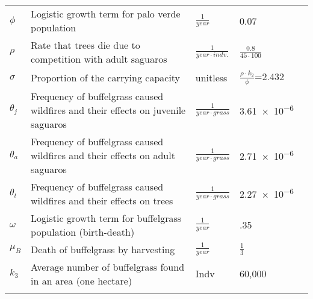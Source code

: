 \begin{longtable}{m{1cm} m{6cm} m{1.5cm} m{1cm} m{1.3cm}}
\rule{0pt}{.7cm}$\phi$ & Logistic growth term for palo verde population &  $\displaystyle\frac{1}{year}$ & 0.07 & \cite{paloVerdeFacts}\\

\rule{0pt}{.7cm}$\rho$ & Rate that trees die due to competition with adult saguaros & $\displaystyle\frac{1}{year\cdot indv.}$&$\frac{0.8}{45 \cdot 100}$ & \cite{Orum,PaloVFact,Bashan2009}\\

\rule{0pt}{.7cm}$\sigma$ & Proportion of the carrying capacity & unitless & $\displaystyle\frac{\rho \cdot k_2}{\phi}$=2.432 & \cite{Orum,PaloVFact,Bashan2009,A-SdesertMuseum,paloVerdeFacts}\\

\rule{0pt}{.7cm}$\theta_j$ & Frequency of buffelgrass caused wildfires and their effects on juvenile saguaros & $\displaystyle\frac{1}{year \cdot grass}$ & \num{3.61e-6} & \cite{kaufman2007invasive,FirePdistance,BuffelManag,Wildfire}\\

\rule{0pt}{.7cm}$\theta_a$ & Frequency of buffelgrass caused wildfires and their effects on adult saguaros & $\displaystyle\frac{1}{year \cdot grass}$ & \num{2.71e-6} & \cite{buyuktahtakin2014invasive,kaufman2007invasive,FirePdistance,BuffelManag,Wildfire}\\

\rule{0pt}{.7cm}$\theta_t$ & Frequency of buffelgrass caused wildfires and their effects on trees & $\displaystyle\frac{1}{year \cdot grass}$ & \num{2.27e-6} & \cite{FireEffects,kaufman2007invasive,FirePdistance,BuffelManag,Wildfire} \\

\rule{0pt}{.7cm}$\omega$ & Logistic growth term for buffelgrass population (birth-death) & $\displaystyle\frac{1}{year}$ & .35 & \cite{NPSbuffelFact}\\

\rule{0pt}{.7cm}$\mu_B$ & Death of buffelgrass by harvesting & $\displaystyle\frac{1}{year}$ & $\displaystyle\frac{1}{3}$ & \cite{NPSbuffel}\\

\rule{0pt}{.7cm}$k_3$ & Average number of buffelgrass found in an area (one hectare) & Indv & 60,000 & \cite{buyuktahtakin2014invasive}\\ \\
\hline

\end{longtable}
